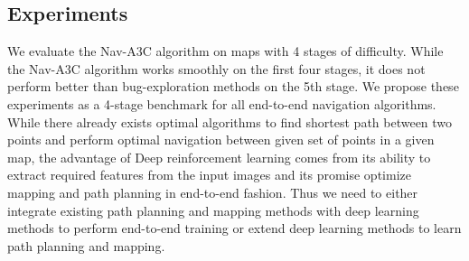 \subsection{Experiments}
\label{sec:navtasks}
We evaluate the Nav-A3C algorithm on maps with 4 stages of difficulty. While the Nav-A3C algorithm works smoothly on the first four stages, it does not perform better than bug-exploration methods on the 5th stage.
We propose these experiments as a 4-stage benchmark for all end-to-end navigation algorithms.
While there already exists optimal algorithms to find shortest path between two points and perform optimal navigation between given set of points in a given map, the advantage of Deep reinforcement learning comes from its ability to extract required features from the input images and its promise
optimize mapping and path planning in end-to-end fashion. 
Thus we need to either integrate existing path planning and mapping methods with deep learning methods to perform end-to-end training or extend deep learning methods to learn path planning and mapping.

